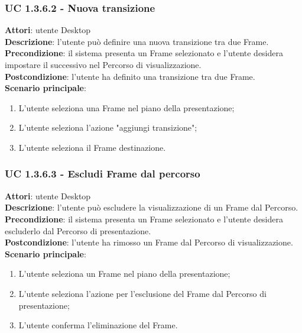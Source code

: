 \subsubsection{UC 1.3.6.2 - Nuova transizione}{
	\label{uc1.3.6.2}
	\textbf{Attori}: utente Desktop \\
	\textbf{Descrizione}: l'utente può definire una nuova transizione tra due Frame. \\
	\textbf{Precondizione}: il sistema presenta un Frame selezionato e l'utente desidera impostare il successivo nel Percorso di visualizzazione.	\\
	\textbf{Postcondizione}: l'utente ha definito una transizione tra due Frame.	\\
	\textbf{Scenario principale}:
	\begin{enumerate}
		\item L'utente seleziona una Frame nel piano della presentazione;
		\item L'utente seleziona l'azione "aggiungi transizione";
		\item L'utente seleziona il Frame destinazione.
	\end{enumerate}
}
\subsubsection{UC 1.3.6.3 - Escludi Frame dal percorso}{
	\label{uc1.3.6.3}
	\textbf{Attori}: utente Desktop \\
	\textbf{Descrizione}: l'utente può escludere la visualizzazione di un Frame dal Percorso. \\
	\textbf{Precondizione}: il sistema presenta un Frame selezionato e l'utente desidera escluderlo dal Percorso di presentazione.	\\
	\textbf{Postcondizione}: l'utente ha rimosso un Frame dal Percorso di visualizzazione.	\\
	\textbf{Scenario principale}:
	\begin{enumerate}
		\item L'utente seleziona un Frame nel piano della presentazione;
		\item L'utente seleziona l'azione per l'esclusione del Frame dal Percorso di presentazione;
		\item L'utente conferma l'eliminazione del Frame.
	\end{enumerate}
}
